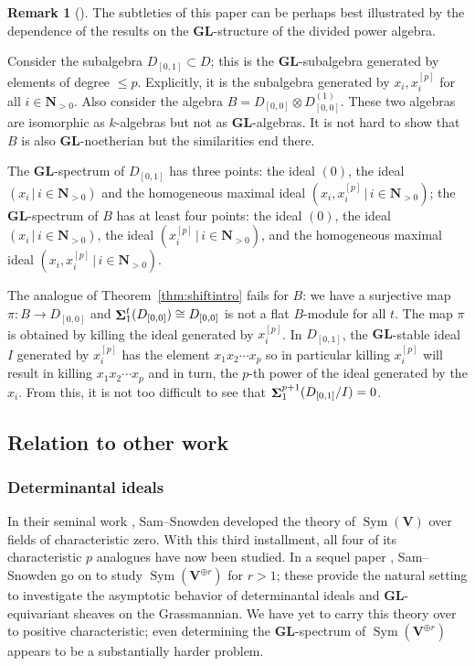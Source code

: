 \documentclass[12pt]{amsart}
\newcommand{\bN}{\mathbf{N}}
\newcommand{\bV}{\mathbf{V}}
\DeclareMathOperator{\Sym}{Sym}
\DeclareMathOperator{\Sh}{\bf{\Sigma}}
\newcommand{\GL}{\mathbf{GL}}
\numberwithin{equation}{section}
\theoremstyle{definition}
\newtheorem{rmk}[equation]{Remark}
\newenvironment{remark}[1][]{\begin{rmk}[#1] \pushQED{\qed}}{\popQED \end{rmk}}
\theoremstyle{plain}
\begin{document}
\begin{remark}\label{rmk:DvsBinf}
    The subtleties of this paper can be perhaps best illustrated by the dependence of the results on the $\GL$-structure of the divided power algebra.
    
    Consider the subalgebra $D_{[0,1]} \subset D$; this is the $\GL$-subalgebra generated by elements of degree $\leq p$. Explicitly, it is the subalgebra generated by $x_i, x_i^{[p]}$ for all $i \in \bN_{>0}$. Also consider the algebra $B = D_{[0,0]} \otimes D_{[0,0]}^{(1)}$. These two algebras are isomorphic as $k$-algebras but not as $\GL$-algebras. It is not hard to show that $B$ is also $\GL$-noetherian but the similarities end there.
     
    The $\GL$-spectrum of $D_{[0,1]}$ has three points: the ideal $(0)$, the ideal $(x_i \,|\, i \in \bN_{>0})$ and the homogeneous maximal ideal $(x_i, x_i^{[p]} \,|\, i \in \bN_{>0})$; the $\GL$-spectrum of $B$ has at least four points: the ideal $(0)$, the ideal $(x_i \,|\, i \in \bN_{>0})$, the ideal $(x_i^{[p]} \,|\, i \in \bN_{>0})$, and the homogeneous maximal ideal $(x_i, x_i^{[p]} \,|\, i \in \bN_{>0})$. 
    
    The analogue of Theorem~\ref{thm:shiftintro} fails for $B$: we have a surjective map $\pi \colon B \to D_{[0,0]}$ and $\Sh_1^t(D_{[0,0]}) \cong D_{[0,0]}$ is not a flat $B$-module for all $t$. The map $\pi$ is obtained by killing the ideal generated by $x_i^{[p]}$. In $D_{[0,1]}$, the $\GL$-stable ideal $I$ generated by $x_i^{[p]}$ has the element $x_1 x_2 \cdots x_p$ so in particular killing $x_i^{[p]}$ will result in killing $x_1 x_2 \cdots x_p$ and in turn, the $p$-th power of the ideal generated by the $x_i$. From this, it is not too difficult to see that $\Sh_1^{p+1}(D_{[0,1]}/ I) = 0$.
\end{remark}

\subsection{Relation to other work}
\subsubsection{Determinantal ideals}
In their seminal work \cite{ss16gl}, Sam--Snowden developed the theory of $\Sym(\bV)$ over fields of characteristic zero. With this third installment, all four of its characteristic $p$ analogues have now been studied. In a sequel paper \cite{ss19gl2}, Sam--Snowden go on to study $\Sym(\bV^{\oplus r})$ for $r > 1$; these provide the natural setting to investigate the asymptotic behavior of determinantal ideals and $\GL$-equivariant sheaves on the Grassmannian. We have yet to carry this theory over to positive characteristic; even determining the $\GL$-spectrum of $\Sym(\bV^{\oplus r})$ appears to be a substantially harder problem.
\end{document}
